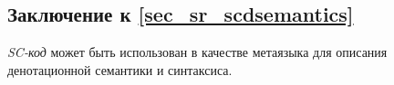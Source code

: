 \begin{comment}
\begin{SCn}
	\scnheader{Логическая онтология SC-пространства}
	\scnrelto{логическая онтология}{Базовая денотационная семантика SC-пространства}
	\scntext{примечание}{Приведем некоторые правила, входящие в состав данной логической онтологии:
		\begin{textitemize}
			\item Вторыми компонентами \textit{sc-пар} константной парой принадлежности могут быть sc-элементы \myuline{любого} типа(в том числе, и \textit{sc-переменные}), но первыми компонентами таких \textit{sc-пар} могут быть только \myuline{константные} \textit{sc-множества}
			\item Знак \textit{sc-ситуации} связан с элементами этой ситуации \textit{sc-парами} константной \myuline{постоянной} позитивной принадлежности. То есть позитивная принадлежность считается постоянной в рамках интервала времени существования соответствующей ситуации. В этом смысле ситуацию можно считать квазистатической
			\item Знак атомарной логической формулы связан со всеми элементами этой формулы \textit{sc-парами} \myuline{константной} постоянной позитивной принадлежности, в том числе, и с теми элементами атомарной формулы, которые являются \textit{sc-переменными}
			\item Из переменного \textit{sc-множества} могут выходить только переменные \textit{sc-пары принадлежности}
			\item Не существует sc-пар принадлежности выходящих из обозначений внешних сущностей и \textit{sc-пар}
			\item и другие
		\end{textitemize}
	}
\end{SCn}
\end{comment}

\subsection*{Заключение к \ref{sec_sr_scdsemantics}}
\textit{SC-код} может быть использован в качестве метаязыка для описания  денотационной семантики и синтаксиса.

